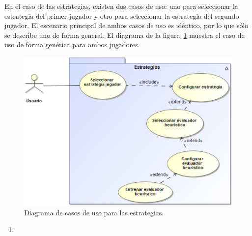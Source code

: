 En el caso de las estrategias, existen dos casos de uso: uno para seleccionar la estrategia del primer jugador y otro para seleccionar la estrategia del segundo jugador.
El escenario principal de ambos casos de uso es idéntico, por lo que sólo se describe uno de forma general. 
El diagrama de la figura~\ref{fig:casos_uso_estrategias} muestra el caso de uso de forma genérica para ambos jugadores.
\begin{figure}[h]
	\centering
	\includegraphics[scale=0.5]{contenido/cap5/imagenes/seleccionarEstrategia.eps}
	\caption{Diagrama de casos de uso para las estrategias.}
	\label{fig:casos_uso_estrategias}
\end{figure}
\begin{enumerate}[resume]
	\item {}
\end{enumerate}
 